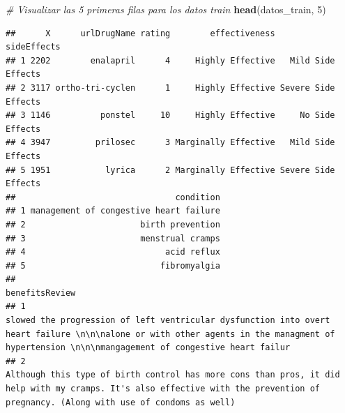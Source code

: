 \documentclass[spanish,]{article}
\newenvironment{Shaded}{\begin{snugshade}}{\end{snugshade}}
\newcommand{\CommentTok}[1]{\textcolor[rgb]{0.56,0.35,0.01}{\textit{#1}}}
\newcommand{\DecValTok}[1]{\textcolor[rgb]{0.00,0.00,0.81}{#1}}
\newcommand{\KeywordTok}[1]{\textcolor[rgb]{0.13,0.29,0.53}{\textbf{#1}}}
\newcommand{\NormalTok}[1]{#1}
\begin{document}
\begin{Shaded}
\begin{Highlighting}[]
\CommentTok{# Visualizar las 5 primeras filas para los datos train}
\KeywordTok{head}\NormalTok{(datos_train, }\DecValTok{5}\NormalTok{) }
\end{Highlighting}
\end{Shaded}

\begin{verbatim}
##      X      urlDrugName rating        effectiveness         sideEffects
## 1 2202        enalapril      4     Highly Effective   Mild Side Effects
## 2 3117 ortho-tri-cyclen      1     Highly Effective Severe Side Effects
## 3 1146          ponstel     10     Highly Effective     No Side Effects
## 4 3947         prilosec      3 Marginally Effective   Mild Side Effects
## 5 1951           lyrica      2 Marginally Effective Severe Side Effects
##                                condition
## 1 management of congestive heart failure
## 2                       birth prevention
## 3                       menstrual cramps
## 4                            acid reflux
## 5                           fibromyalgia
##                                                                                                                                                                                                                                                                                                                                                                                                                                                                                                                                                                                                           benefitsReview
## 1                                                                                                                                                                                                                                                                                                                                                                                                                         slowed the progression of left ventricular dysfunction into overt heart failure \n\n\nalone or with other agents in the managment of hypertension \n\n\nmangagement of congestive heart failur
## 2                                                                                                                                                                                                                                                                                                                                                                                                                                     Although this type of birth control has more cons than pros, it did help with my cramps. It's also effective with the prevention of pregnancy. (Along with use of condoms as well)

\end{verbatim}
\end{document}
